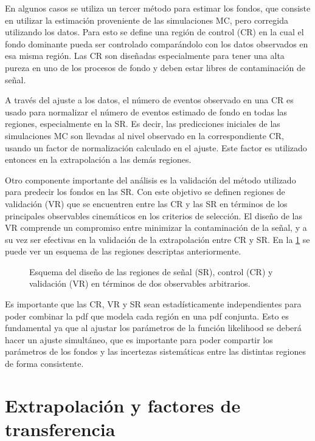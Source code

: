 En algunos casos se utiliza un tercer método para estimar los fondos, que consiste en
utilizar la estimación proveniente de las simulaciones MC, pero corregida
utilizando los datos. Para esto se define una región de control (CR) en
la cual el fondo dominante pueda ser controlado comparándolo con los datos
observados en esa misma región. Las CR son diseñadas especialmente para tener
una alta pureza en uno de los procesos de fondo y deben estar libres de
contaminación de señal.

A través del ajuste a los datos, el número de eventos observado en una CR es
usado para normalizar el número de eventos estimado de fondo en todas las
regiones, especialmente en la SR. Es decir, las predicciones iniciales de las
simulaciones MC son llevadas al nivel observado en la correspondiente CR,
usando un factor de normalización calculado en el ajuste. Este factor es
utilizado entonces en la extrapolación a las demás regiones.

Otro componente importante del análisis es la validación del método utilizado
para predecir los fondos en las SR. Con este objetivo se definen regiones de
validación (VR) que se encuentren entre las CR y las SR en términos de los
principales observables cinemáticos en los criterios de selección. El diseño de
las VR comprende un compromiso entre minimizar la contaminación de la señal, y a su
vez ser efectivas en la validación de la extrapolación entre CR y SR. En la
\cref{fig:regions_sketch} se puede ver un esquema de las regiones descriptas
anteriormente.

\begin{figure}[!htbp]
  \centering 
  \caption{Esquema del diseño de las regiones de señal (SR), control (CR) y
    validación (VR) en términos de dos observables arbitrarios.}
  \label{fig:regions_sketch}
\end{figure}

Es importante que las CR, VR y SR sean estadísticamente independientes para
poder combinar la pdf que modela cada región en una pdf conjunta. Esto es
fundamental ya que al ajustar los parámetros de la función likelihood se deberá
hacer un ajuste simultáneo, que es importante para poder compartir los
parámetros de los fondos y las incertezas sistemáticas entre las distintas
regiones de forma consistente.


\section{Extrapolación y factores de transferencia}

